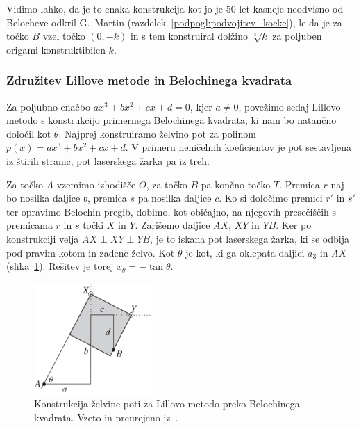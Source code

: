 Vidimo lahko, da je to enaka konstrukcija kot jo je 50 let kasneje neodvisno od Belocheve odkril G.\ Martin (razdelek~\ref{podpogl:podvojitev_kocke}), le da je za točko $B$ vzel točko $(0, -k)$ in s tem konstruiral dolžino $\sqrt[3]{k}$ za poljuben origami-konstruktibilen $k$.

\subsubsection*{Združitev Lillove metode in Belochinega kvadrata}

Za poljubno enačbo $a x^3 + b x^2 + c x + d = 0$, kjer $ a \neq 0$, povežimo sedaj Lillovo metodo s konstrukcijo primernega Belochinega kvadrata, ki nam bo natančno določil kot $\theta$. Najprej konstruiramo želvino pot za polinom $p(x) = a x^3 + b x^2 + c x + d$. V primeru neničelnih koeficientov je pot sestavljena iz štirih stranic, pot laserskega žarka pa iz treh.

Za točko $A$ vzemimo izhodišče $O$, za točko $B$ pa končno točko $T$. Premica $r$ naj bo nosilka daljice $b$, premica $s$ pa nosilka daljice $c$. Ko si določimo premici $r'$ in $s'$ ter opravimo Belochin pregib, dobimo, kot običajno, na njegovih presečiščih s premicama $r$ in $s$ točki $X$ in $Y$. Zarišemo daljice $AX$, $XY$ in $YB$. Ker po konstrukciji velja $ AX \perp XY \perp YB $, je to iskana pot laserskega žarka, ki se odbija pod pravim kotom in zadene želvo. Kot $\theta$ je kot, ki ga oklepata daljici $a_3$ in $AX$ (slika~\ref{fig:beloch_kubicna_resitev}). Rešitev je torej $x_{\theta} = - \tan \theta$.

\begin{figure}[h]
    \centering
    \includegraphics[width=0.4\textwidth]{images/kubična enačba/beloch_kubicna_resitev.png}
    \caption[Lillova metoda z Belochinim kvadratom]{Konstrukcija želvine poti za Lillovo metodo preko Belochinega kvadrata. Vzeto in preurejeno iz~\cite[str.\ 313]{hull2011}.}
    \label{fig:beloch_kubicna_resitev}
\end{figure}


